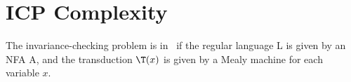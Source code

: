 
\section{ICP Complexity}\label{sec:icpComplexity}

\begin{theorem}
	The invariance-checking problem is in \psp\ if the regular language L is given by an NFA A, and the transduction $\T(x)$ is given by a
	Mealy machine for each variable $x$.
\end{theorem}

